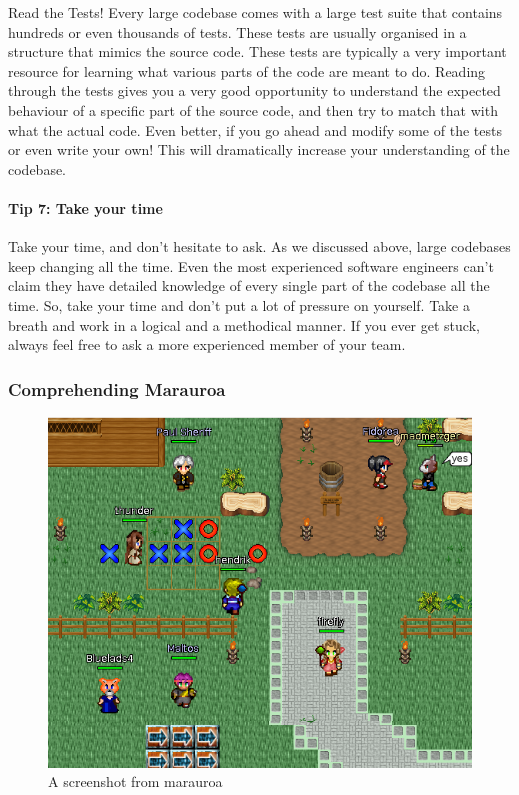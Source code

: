 \documentclass[
]{book}
\begin{document}
Read the Tests! Every large codebase comes with a large test suite that contains hundreds or even thousands of tests. These tests are usually organised in a structure that mimics the source code. These tests are typically a very important resource for learning what various parts of the code are meant to do. Reading through the tests gives you a very good opportunity to understand the expected behaviour of a specific part of the source code, and then try to match that with what the actual code. Even better, if you go ahead and modify some of the tests or even write your own! This will dramatically increase your understanding of the codebase.

\hypertarget{tip-7-take-your-time}{%
\paragraph{Tip 7: Take your time}\label{tip-7-take-your-time}}

Take your time, and don't hesitate to ask. As we discussed above, large codebases keep changing all the time. Even the most experienced software engineers can't claim they have detailed knowledge of every single part of the codebase all the time. So, take your time and don't put a lot of pressure on yourself. Take a breath and work in a logical and a methodical manner. If you ever get stuck, always feel free to ask a more experienced member of your team.

\hypertarget{comprehension}{%
\subsubsection{Comprehending Marauroa}\label{comprehension}}

\begin{figure}

{\centering \includegraphics[width=1\linewidth]{images/marauroa2} 

}

\caption{A screenshot from marauroa}\label{fig:marauroa2-fig}
\end{figure}
\end{document}
